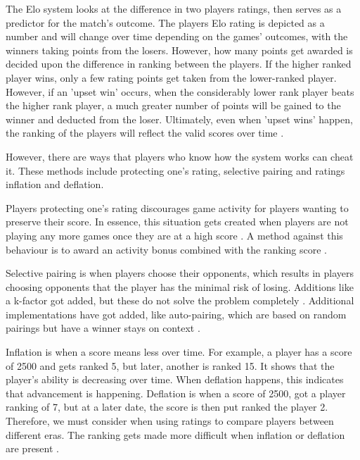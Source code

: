 		The Elo system looks at the difference in two players ratings, then serves as a predictor for the match's outcome. The players Elo rating is depicted as a number and will change over time depending on the games' outcomes, with the winners taking points from the losers. However, how many points get awarded is decided upon the difference in ranking between the players. If the higher ranked player wins, only a few rating points get taken from the lower-ranked player. However, if an 'upset win' occurs, when the considerably lower rank player beats the higher rank player, a much greater number of points will be gained to the winner and deducted from the loser. Ultimately, even when 'upset wins' happen, the ranking of the players will reflect the valid scores over time \cite{sullivan2016improving}.
		
		However, there are ways that players who know how the system works can cheat it. These methods include protecting one's rating, selective pairing and ratings inflation and deflation.
		
		Players protecting one's rating discourages game activity for players wanting to preserve their score. In essence, this situation gets created when players are not playing any more games once they are at a high score \cite{friedman2013playing}.  A method against this behaviour is to award an activity bonus combined with the ranking score \cite{edelkamp2021elo}.
		
		Selective pairing is when players choose their opponents, which results in players choosing opponents that the player has the minimal risk of losing. Additions like a k-factor got added, but these do not solve the problem completely \cite{edelkamp2021elo}. Additional implementations have got added, like auto-pairing, which are based on random pairings but have a winner stays on context \cite{edelkamp2021elo}.
		
		
		Inflation is when a score means less over time. For example, a player has a score of 2500 and gets ranked 5, but later, another is ranked 15. It shows that the player's ability is decreasing over time. When deflation happens, this indicates that advancement is happening. Deflation is when a score of 2500, got a player ranking of 7, but at a later date, the score is then put ranked the player 2. Therefore, we must consider when using ratings to compare players between different eras. The ranking gets made more difficult when inflation or deflation are present \cite{williams2013abstracting}. %
		
